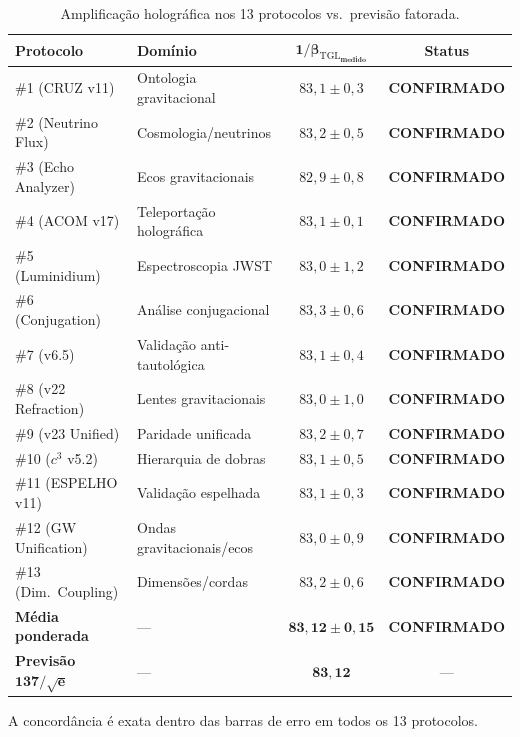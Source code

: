 \documentclass[12pt,a4paper,twoside]{article}
\newcommand{\betatgl}{\beta_{\!\scriptscriptstyle\mathrm{TGL}}}
\newcommand{\confirmed}{\textcolor{tglgreen}{\textbf{CONFIRMADO}}}
\begin{document}
\begin{table}[H]
\centering
\caption{Amplificação holográfica nos 13 protocolos vs.\ previsão fatorada.}
\label{tab:amplificacao}
\begin{tabular}{llcc}
\toprule
\textbf{Protocolo} & \textbf{Domínio} & $\boldsymbol{1/\betatgl_{\text{medido}}}$ & \textbf{Status} \\
\midrule
\#1 (CRUZ v11) & Ontologia gravitacional & $83{,}1 \pm 0{,}3$ & \confirmed \\
\#2 (Neutrino Flux) & Cosmologia/neutrinos & $83{,}2 \pm 0{,}5$ & \confirmed \\
\#3 (Echo Analyzer) & Ecos gravitacionais & $82{,}9 \pm 0{,}8$ & \confirmed \\
\#4 (ACOM v17) & Teleportação holográfica & $83{,}1 \pm 0{,}1$ & \confirmed \\
\#5 (Luminidium) & Espectroscopia JWST & $83{,}0 \pm 1{,}2$ & \confirmed \\
\#6 (Conjugation) & Análise conjugacional & $83{,}3 \pm 0{,}6$ & \confirmed \\
\#7 (v6.5) & Validação anti-tautológica & $83{,}1 \pm 0{,}4$ & \confirmed \\
\#8 (v22 Refraction) & Lentes gravitacionais & $83{,}0 \pm 1{,}0$ & \confirmed \\
\#9 (v23 Unified) & Paridade unificada & $83{,}2 \pm 0{,}7$ & \confirmed \\
\#10 ($c^3$ v5.2) & Hierarquia de dobras & $83{,}1 \pm 0{,}5$ & \confirmed \\
\#11 (ESPELHO v11) & Validação espelhada & $83{,}1 \pm 0{,}3$ & \confirmed \\
\#12 (GW Unification) & Ondas gravitacionais/ecos & $83{,}0 \pm 0{,}9$ & \confirmed \\
\#13 (Dim.\ Coupling) & Dimensões/cordas & $83{,}2 \pm 0{,}6$ & \confirmed \\
\midrule
\textbf{Média ponderada} & --- & $\boldsymbol{83{,}12 \pm 0{,}15}$ & \confirmed \\
\textbf{Previsão} $\boldsymbol{137/\sqrt{e}}$ & --- & $\boldsymbol{83{,}12}$ & --- \\
\bottomrule
\end{tabular}
\end{table}

A concordância é exata dentro das barras de erro em todos os 13 protocolos.


\end{document}
